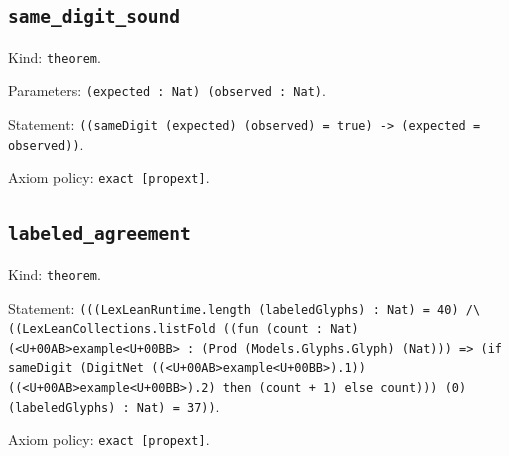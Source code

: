 \documentclass[11pt]{article}
\begin{document}
\subsection*{\texttt{same\_digit\_sound}}
\noindent Kind: \texttt{theorem}.\par
\noindent Parameters: \texttt{(expected : Nat) (observed : Nat)}.\par
\noindent Statement: \texttt{((sameDigit (expected) (observed) = true) -> (expected = observed))}.\par
\noindent Axiom policy: \texttt{exact [propext]}.\par
\subsection*{\texttt{labeled\_agreement}}
\noindent Kind: \texttt{theorem}.\par
\noindent Statement: \texttt{(((LexLeanRuntime.length (labeledGlyphs) : Nat) = 40) /\textbackslash{} ((LexLeanCollections.listFold ((fun (count : Nat) (<U+00AB>example<U+00BB> : (Prod (Models.Glyphs.Glyph) (Nat))) => (if sameDigit (DigitNet ((<U+00AB>example<U+00BB>).1)) ((<U+00AB>example<U+00BB>).2) then (count + 1) else count))) (0) (labeledGlyphs) : Nat) = 37))}.\par
\noindent Axiom policy: \texttt{exact [propext]}.\par
\end{document}
